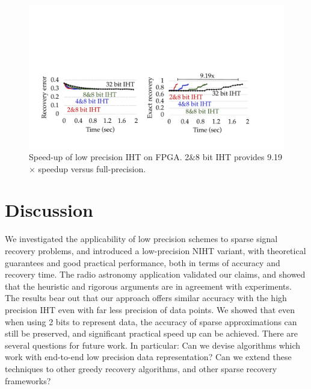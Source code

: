 \documentclass{article}
\begin{document}
\begin{figure}[t!]
\centering
\includegraphics[width=0.76\columnwidth, angle=0]{figs/fpga_k.pdf}
\caption{Speed-up of low precision IHT on FPGA. 2\&8 bit IHT provides 9.19$\times$ speedup versus full-precision.}
\label{fig:fpga_time}
\end{figure}

\vspace{-0.5em}
\section{Discussion}\label{section_discussion}
\vspace{-1em}

We investigated the applicability of low precision schemes to sparse signal recovery problems, and introduced a low-precision NIHT variant, with theoretical guarantees and good practical performance, both in terms of accuracy and recovery time. 
The radio astronomy application validated our claims, and showed that the heuristic and rigorous arguments are in agreement with experiments. The results bear out that our approach offers similar accuracy with the high precision IHT even with far less precision of data points. We showed that even when using 2 bits to represent data,  the accuracy of sparse approximations can still be preserved, and significant practical speed up can be achieved.
There are several questions for future work. In particular: Can we devise algorithms which work with end-to-end low precision data representation? Can we extend these techniques to other greedy recovery algorithms, and other sparse recovery frameworks?


\end{document}
